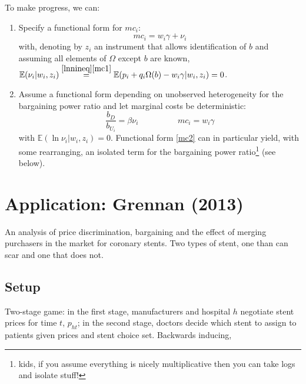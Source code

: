 \documentclass[11pt]{article}
\numberwithin{equation}{section}
\begin{document}
To make progress, we can:
\begin{enumerate}

\item Specify a functional form for $mc_i$:
\begin{equation}
\label{mc1}
	mc_i = w_i \gamma + \nu_i
\end{equation}
with, denoting by $z_i$ an instrument that allows identification of $b$ and assuming all elements of $\Omega$ except $b$ are known,
$ \mathbb{E}(\nu_i | w_i, z_i) \overset{\eqref{lnnineq}\eqref{mc1}}{=} \mathbb{E}(p_i + q_i \Omega(b) - w_i \gamma | w_i,z_i) = 0 $.

\item Assume a functional form depending on unobserved heterogeneity for the bargaining power ratio and let marginal costs be deterministic:
\begin{equation}
\label{mc2}
	\frac{b_D}{b_{U_i}} = \beta \nu_i \hspace{2cm} mc_i = w_i \gamma
\end{equation}
with $\mathbb{E}(\ln \nu_i | w_i, z_i) = 0$. Functional form \eqref{mc2} can in particular yield, with some rearranging, an isolated term for the bargaining power ratio\footnote{kids, if you assume everything is nicely multiplicative then you can take logs and isolate stuff!} (see below).
\end{enumerate}

\section{Application: Grennan (2013)}

An analysis of price discrimination, bargaining and the effect of merging purchasers in the market for coronary stents.
Two types of stent, one than can scar and one that does not.

\subsection{Setup}

Two-stage game: in the first stage, manufacturers and hospital $h$ negotiate stent prices for time $t$, $p_{ht}$; in the second stage, doctors decide which stent to assign to patients given prices and stent choice set. Backwards inducing,
\end{document}
